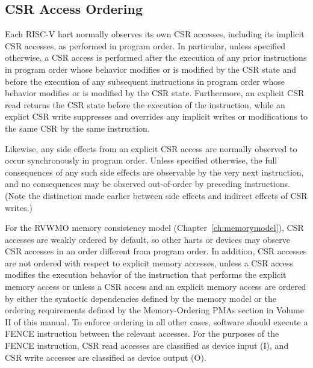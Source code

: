 \subsection*{CSR Access Ordering}

Each RISC-V hart normally observes its own CSR accesses, including its
implicit CSR accesses, as performed in program order.
In particular, unless specified otherwise, a CSR access is performed
after the execution of any prior instructions in program order whose behavior
modifies or is modified by the CSR state and before the execution of any
subsequent instructions in program order whose behavior modifies or is modified
by the CSR state.
Furthermore, an explicit CSR read returns the
CSR state before the execution of the instruction, while an
explict CSR write suppresses and overrides any implicit writes or
modifications to the same CSR by the same instruction.

Likewise, any side effects from an explicit CSR access are normally
observed to occur synchronously in program order.
Unless specified otherwise, the full consequences of any such side
effects are observable by the very next instruction, and no consequences
may be observed out-of-order by preceding instructions.
(Note the distinction made earlier between side effects and indirect
effects of CSR writes.)

For the RVWMO memory consistency model (Chapter~\ref{ch:memorymodel}),
CSR accesses are weakly ordered by default,
so other harts or devices may observe CSR accesses in an order
different from program order. In addition, CSR accesses are not ordered with
respect to explicit memory accesses, unless a CSR access modifies the execution
behavior of the instruction that performs the explicit memory access or unless
a CSR access and an explicit memory access are ordered by either the syntactic
dependencies defined by the memory model or the ordering requirements defined
by the Memory-Ordering PMAs section in Volume II of this manual. To enforce
ordering in all other cases, software should execute a FENCE instruction
between the relevant accesses. For the purposes of the FENCE instruction, CSR
read accesses are classified as device input (I), and CSR write accesses are
classified as device output (O).

